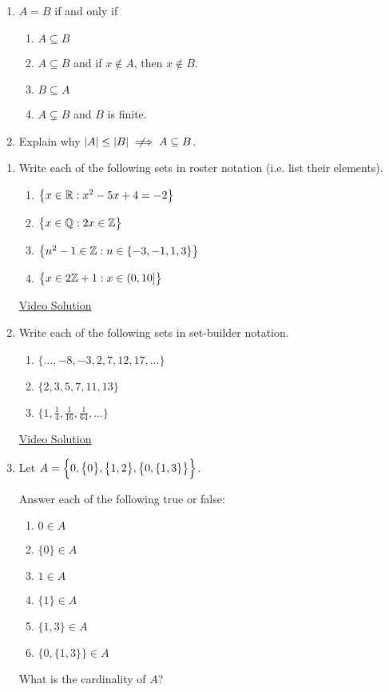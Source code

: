 \begin{enumerate}
  \item $A=B$ if and only if
  \begin{enumerate}
    \item $A\subseteq B$
    \item $A\subseteq B$ and if $x\notin A$, then $x\notin B$.
    \item $B\subseteq A$
    \item $A\subsetneq B$ and $B$ is finite. 
  \end{enumerate}
  
	\item Explain why $\nm A\le \nm B\notimplies A\subseteq B$.
\end{enumerate}



\begin{enumerate}
  \item Write each of the following sets in roster notation (i.e. list their elements).
  \begin{enumerate}
    \item $\bigl\{x\in\mathbb{R}:x^2-5x+4=-2\bigr\}$
    \item $\bigl\{x\in\mathbb{Q}:2x\in\mathbb{Z}\bigr\}$
    \item $\bigl\{n^2-1\in\mathbb{Z}:n\in\{-3,-1,1,3\}\bigr\}$
    \item $\bigl\{x\in 2\mathbb{Z}+1:x\in(0,10]\bigr\}$
  \end{enumerate}
    
  \href{https://youtu.be/UkwSlMK6-OM}{Video Solution}
    
  \item Write each of the following sets in set-builder notation.
  \begin{enumerate}
    \item $\bigl\{\ldots,-8,-3,2,7,12,17,\ldots\bigr\}$
    \item $\bigl\{2,3,5,7,11,13\bigr\}$
    \item $\bigl\{1,\frac{1}{4},\frac{1}{16},\frac{1}{64},\ldots\bigr\}$
  \end{enumerate}
    
  \href{https://youtu.be/mBtKZXmbp54}{Video Solution}
    
  \item Let $A=\Bigl\{0, \bigl\{0\bigr\}, \bigl\{1,2\bigr\}, \bigl\{0,\{1,3\}\bigr\}\Bigr\}$.\par
  Answer each of the following true or false:
  \begin{enumerate}
    \item $0\in A$
    \item $\{0\}\in A$
    \item $1\in A$
    \item $\{1\}\in A$
    \item $\{1,3\}\in A$
    \item $\bigl\{0,\{1,3\}\bigr\}\in A$
  \end{enumerate}
  What is the cardinality of $A$?
    

\end{enumerate}
